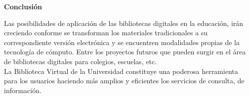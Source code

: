 \documentclass{article}
\begin{document}
\begin{multicols}{2}
\begin{center}
\textbf{Conclusión} 
\end{center}
Las posibilidades de aplicación de las bibliotecas digitales en la educación, irán creciendo conforme se transforman los materiales tradicionales a su correspondiente versión electrónica y se encuentren modalidades propias de la tecnología de cómputo. Entre los proyectos futuros que pueden surgir en el área de bibliotecas digitales para colegios, escuelas, etc. \\
La Biblioteca Virtual de la Universidad constituye una poderosa herramienta para los usuarios haciendo más amplios y eficientes los servicios de consulta, de información.

\end{multicols}
\end{document}
